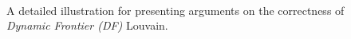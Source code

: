 \begin{figure}[hbtp]
  \centering
   \\[-2ex]
  \caption{A detailed illustration for presenting arguments on the correctness of \textit{Dynamic Frontier (DF)} Louvain.}
  \label{fig:frontier-approach}
\end{figure}
